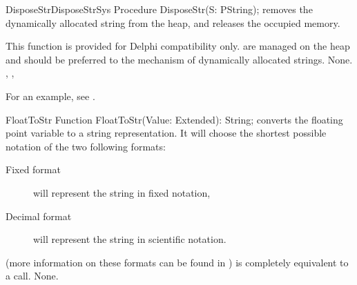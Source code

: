 



\begin{procedurel}{DisposeStr}{DisposeStrSys}
\Declaration
Procedure DisposeStr(S: PString);
\Description
{} removes the dynamically allocated string  from the
heap, and releases the occupied memory.

This function is provided for Delphi compatibility only. 
are managed on the heap and should be preferred to the mechanism of
dynamically allocated strings.
\Errors
None.
\SeeAlso
{}, , 
\end{procedurel}

For an example, see .

\begin{function}{FloatToStr}
\Declaration
Function FloatToStr(Value: Extended): String;
\Description
{} converts the floating point variable  to a
string representation.  It will choose the shortest possible notation of the
two following formats:
\begin{description}
\item[Fixed format] will represent the string in fixed notation,
\item[Decimal format] will represent the string in scientific notation.
\end{description}
(more information on these formats can be found in )
 is completely equivalent to a  call.
\Errors
None.
\SeeAlso
{}
\end{function}



